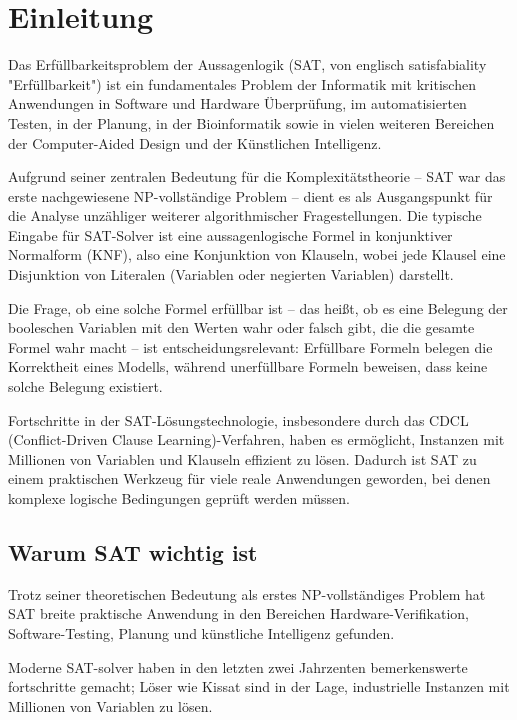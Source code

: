 \section{Einleitung}\label{sec:einleitung}

Das Erfüllbarkeitsproblem der Aussagenlogik (SAT, von englisch satisfabiality "Erfüllbarkeit") ist ein 
fundamentales Problem der Informatik mit kritischen Anwendungen in Software und Hardware Überprüfung, im 
automatisierten Testen, in der Planung, in der Bioinformatik sowie in vielen weiteren Bereichen der 
Computer-Aided Design und der Künstlichen Intelligenz.

Aufgrund seiner zentralen Bedeutung für die Komplexitätstheorie – SAT war das erste nachgewiesene 
NP-vollständige Problem –\cite{cambridge_sat_2012} dient es als Ausgangspunkt für die Analyse unzähliger weiterer algorithmischer 
Fragestellungen. Die typische Eingabe für SAT-Solver ist eine aussagenlogische Formel in konjunktiver 
Normalform (KNF), also eine Konjunktion von Klauseln, wobei jede Klausel eine Disjunktion von Literalen 
(Variablen oder negierten Variablen) darstellt.

Die Frage, ob eine solche Formel erfüllbar ist – das heißt, ob es eine Belegung der booleschen Variablen 
mit den Werten wahr oder falsch gibt, die die gesamte Formel wahr macht – ist entscheidungsrelevant: 
Erfüllbare Formeln belegen die Korrektheit eines Modells, während unerfüllbare Formeln beweisen, dass 
keine solche Belegung existiert.

Fortschritte in der SAT-Lösungstechnologie, insbesondere durch das CDCL 
(Conflict-Driven Clause Learning)-Verfahren, haben es ermöglicht, Instanzen mit Millionen von 
Variablen und Klauseln effizient zu lösen\cite{springer_cdcl_2020}. Dadurch ist SAT zu einem praktischen Werkzeug für 
viele reale Anwendungen geworden, bei denen komplexe logische Bedingungen geprüft werden müssen.\cite{cambridge_applications_2012}

\newpage

\subsection{Warum SAT wichtig ist}

Trotz seiner theoretischen Bedeutung als erstes NP-vollständiges Problem hat SAT breite 
praktische Anwendung in den Bereichen Hardware-Verifikation, Software-Testing, Planung und künstliche
Intelligenz gefunden.\cite{cook1971complexity}

Moderne SAT-solver haben in den letzten zwei Jahrzenten bemerkenswerte fortschritte gemacht; Löser wie
Kissat sind in der Lage, industrielle Instanzen mit Millionen von Variablen zu
lösen.\cite{biere2020cadical}

